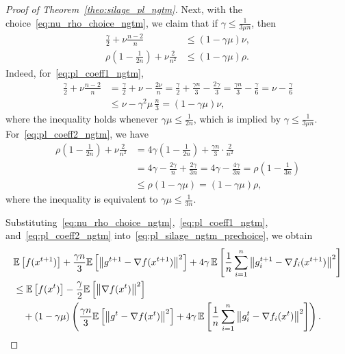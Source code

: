 \documentclass{article}
\newcommand{\bb}{\mathbb}
\newcommand{\sqn}[1]{\left\| #1 \right\|^2}
\newcommand{\Exp}[1]{{\bb E}\left[#1\right]}
\theoremstyle{plain}
\begin{document}
\begin{proof}[Proof of Theorem~\ref{theo:silage_pl_ngtm}]


Next, with the choice~\eqref{eq:nu_rho_choice_ngtm}, we claim that if $\gamma \leq \frac{1}{3\mu n}$, then
\begin{align}
\frac{\gamma}{2}+\nu\frac{n-2}{n} &\leq (1-\gamma\mu)\nu,
\label{eq:pl_coeff1_ngtm}\\
\rho\left(1-\frac{1}{2n}\right)+\nu\frac{2}{n^2} &\leq (1-\gamma\mu)\rho.
\label{eq:pl_coeff2_ngtm}
\end{align}
Indeed, for~\eqref{eq:pl_coeff1_ngtm},
\begin{align*}
\frac{\gamma}{2}+\nu\frac{n-2}{n}
&=\frac{\gamma}{2}+\nu-\frac{2\nu}{n}
=\frac{\gamma}{2}+\frac{\gamma n}{3}-\frac{2\gamma}{3}
=\frac{\gamma n}{3}-\frac{\gamma}{6}
=\nu-\frac{\gamma}{6}\\
&\leq \nu-\gamma^2\mu\,\frac{n}{3}
=(1-\gamma\mu)\nu,
\end{align*}
where the inequality holds whenever $\gamma\mu\leq \frac{1}{2n}$, which is implied by $\gamma\leq \frac{1}{3\mu n}$.
For~\eqref{eq:pl_coeff2_ngtm}, we have
\begin{align*}
\rho\left(1-\frac{1}{2n}\right)+\nu\frac{2}{n^2}
&=4\gamma\left(1-\frac{1}{2n}\right)+\frac{\gamma n}{3}\cdot\frac{2}{n^2}\\
&=4\gamma-\frac{2\gamma}{n}+\frac{2\gamma}{3n}
=4\gamma-\frac{4\gamma}{3n}
=\rho\left(1-\frac{1}{3n}\right)\\
&\leq \rho(1-\gamma\mu)
=(1-\gamma\mu)\rho,
\end{align*}
where the inequality is equivalent to $\gamma\mu\leq \frac{1}{3n}$.

Substituting~\eqref{eq:nu_rho_choice_ngtm},~\eqref{eq:pl_coeff1_ngtm}, and~\eqref{eq:pl_coeff2_ngtm}
into~\eqref{eq:pl_silage_ngtm_prechoice}, we obtain
\begin{align}
&\Exp{f(x^{t+1})}
+ \frac{\gamma n}{3}\Exp{\sqn{g^{t+1}-\nabla f(x^{t+1})}}
+ 4\gamma\,\Exp{\frac{1}{n}\sum_{i=1}^n\sqn{g_i^{t+1}-\nabla f_i(x^{t+1})}}\notag\\
&\leq \Exp{f(x^{t})}
-\frac{\gamma}{2}\Exp{\sqn{\nabla f(x^t)}} \notag\\
&\quad + (1-\gamma\mu)\left(
\frac{\gamma n}{3}\Exp{\sqn{g^{t}-\nabla f(x^{t})}}
+ 4\gamma\,\Exp{\frac{1}{n}\sum_{i=1}^n\sqn{g_i^{t}-\nabla f_i(x^{t})}}
\right).
\label{eq:pl_silage_recursion_ngtm}
\end{align}


\end{proof}
\end{document}
